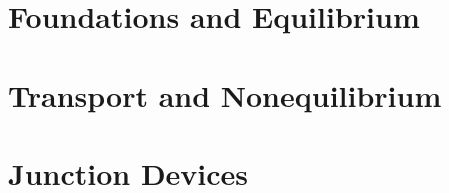 \documentclass[11pt,oneside]{book}
\begin{document}
\hypersetup{pageanchor=false}

\frontmatter
\hypersetup{pageanchor=true}

\tableofcontents

\mainmatter
\part{Foundations and Equilibrium}








\part{Transport and Nonequilibrium}









\part{Junction Devices}







\backmatter
\printbibliography[heading=bibintoc,title={References}]
\end{document}
